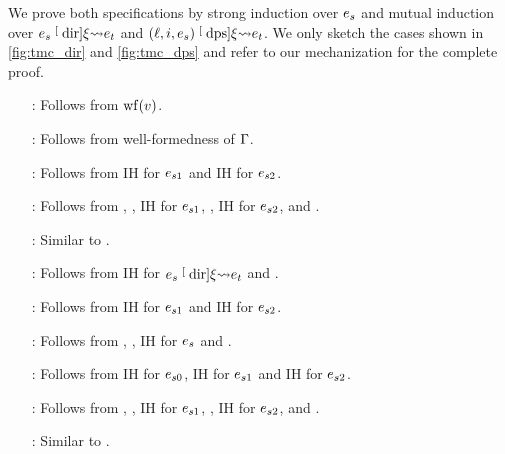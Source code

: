 \begin{myproof}
    We prove both specifications by strong induction over $\datalangExpr_s$ and mutual induction over $\datalangExpr_s \tmcDir{\datalangRenaming} \datalangExpr_t$ and $(\datalangLoc, \datalangIdx, \datalangExpr_s) \tmcDps{\datalangRenaming} \datalangExpr_t$.
    We only sketch the cases shown in \cref{fig:tmc_dir} and \cref{fig:tmc_dps} and refer to our mechanization for the complete proof.
    \begin{itemize}[align=left, leftmargin=*]
        \item[\RefTirName{DirVal}:] Follows from $\wf{\datalangVal}$.
        \item[\RefTirName{DirVar}:] Follows from well-formedness of $\datalangBisubst$.
        \item[\RefTirName{DirLet}:] Follows from IH for $\datalangExpr_{s1}$ and IH for $\datalangExpr_{s2}$.
        \item[\RefTirName{DirBlockDPS1}:] Follows from , , IH for $\datalangExpr_{s1}$, , IH for $\datalangExpr_{s2}$,  and .
        \item[\RefTirName{DirBlockDPS2}:] Similar to .
        \item[\RefTirName{DPSBase}:] Follows from IH for $\datalangExpr_s \tmcDir{\datalangRenaming} \datalangExpr_t$ and .
        \item[\RefTirName{DPSLet}:] Follows from IH for $\datalangExpr_{s1}$ and IH for $\datalangExpr_{s2}$.
        \item[\RefTirName{DPSCall}:] Follows from , , IH for $\datalangExpr_s$ and .
        \item[\RefTirName{DPSIf}:] Follows from IH for $\datalangExpr_{s0}$, IH for $\datalangExpr_{s1}$ and IH for $\datalangExpr_{s2}$.
        \item[\RefTirName{DPSBlock1}:] Follows from , , IH for $\datalangExpr_{s1}$, ,  IH for $\datalangExpr_{s2}$,  and .
        \item[\RefTirName{DPSBlock2}:] Similar to . \qedhere
    \end{itemize}
\end{myproof}

